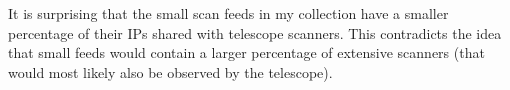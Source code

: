 It is surprising that the small scan feeds in my collection have a smaller percentage of their
IPs shared with telescope scanners. This contradicts the idea that small feeds
would contain a larger percentage of extensive scanners (that would most likely also be observed by the telescope).



